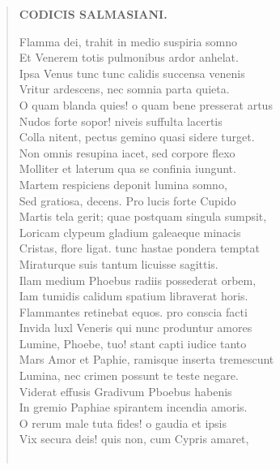 \documentclass[11pt, a4paper]{report}
\begin{document}
\begin{verse}
    \begin{center} \textbf{CODICIS SALMASIANI.} \end{center} \marginpar{[207]} Flamma dei, trahit in medio suspiria somno \\ Et Venerem totis pulmonibus ardor anhelat. \\ Ipsa Venus tunc tunc calidis succensa venenis \\ Vritur ardescens, nec somnia parta quieta. \\ O quam blanda quies! o quam bene presserat artus \\ Nudos forte sopor! niveis suffulta lacertis \\ Colla nitent, pectus gemino quasi sidere turget. \\ Non omnis resupina iacet, sed corpore flexo \\ Molliter et laterum qua se confinia iungunt. \\ Martem respiciens deponit lumina somno, \\ Sed gratiosa, decens. Pro lucis forte Cupido \\ Martis tela gerit; quae postquam singula  \lbrack sumpsit, \\ Loricam clypeum gladium galeaeque minacis \\ Cristas, flore ligat. tunc hastae pondera temptat \\ Miraturque suis tantum licuisse sagittis. \\ Ilam medium Phoebus radiis possederat orbem, \\ Iam tumidis calidum spatium libraverat horis. \\ Flammantes retinebat equos. pro conscia facti \\ Invida luxl Veneris qui nunc produntur amores \\ Lumine, Phoebe, tuo! stant capti iudice tanto \\ Mars Amor et Paphie, ramisque inserta tremescunt \\ Lumina, nec crimen possunt te teste negare. \\ Viderat effusis Gradivum Pboebus habenis \\ In gremio Paphiae spirantem incendia amoris. \\ O rerum male tuta fides! o gaudia et ipsis \\ Vix secura deis! quis non, cum Cypris amaret, \\ 
        ﻿\pagebreak 

\end{verse}
\end{document}

